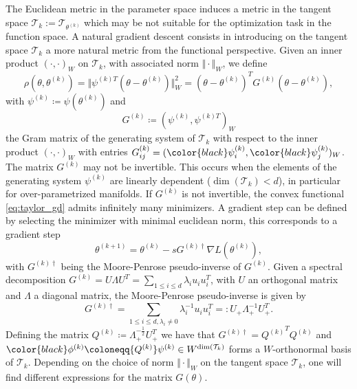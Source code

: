\documentclass{article}
\theoremstyle{noparens}
\newcommand{\cT}{\mathcal{T}}
\newcommand{\colorM}{\color{black}}
\newcommand{\paramk}{\theta^{(k)}}
\newcommand{\paramkp}{\theta^{(k+1)}}
\newcommand{\psik}{\psi^{(k)}}
\newcommand{\psikT}{\psi^{(k)T}}
\newcommand{\psiki}{{\colorM \psi^{(k)}_i}}
\newcommand{\psikj}{{\colorM \psi^{(k)}_j}}
\newcommand{\Qk}{{Q^{(k)}}}
\newcommand{\phik}{{\colorM \phi^{(k)}}}
\newcommand{\Gk}{{G^{(k)}}}
\newcommand{\Ginvk}{{G^{(k)\dagger}}}
\begin{document}
The Euclidean metric in the parameter space induces a metric in the tangent space $\cT_k := \cT_{\paramk}$ which may be not suitable for the optimization task in the function space. A natural gradient descent  consists in introducing on the tangent space $\cT_{k}$ a more natural metric from the functional perspective. Given an inner product $(\cdot, \cdot)_{W}$ on $\cT_{k}$, with associated norm $\Vert \cdot \Vert_{W}$, we define
$$
\rho(\theta , \paramk) =  \Vert \psikT (\theta - \paramk) \Vert_{W}^2 = (\theta - \paramk)^T \Gk (\theta - \paramk),
$$
with $\psik\coloneqq \psi(\paramk)$ and
\begin{equation}
\Gk \coloneqq (\psik ,\psikT)_W
\label{eq:gram}
\end{equation}
the Gram matrix of the generating system of $\cT_{k}$ with respect to the inner product $(\cdot,\cdot)_W$ with entries $G^{(k)}_{ij} = (\psiki ,\psikj )_W$.
The matrix $G^{(k)}$ may not be invertible. This occurs when the elements of the generating system $\psik$ are linearly dependent ($\dim(\cT_k) < d$), in particular for over-parametrized manifolds. If $G^{(k)}$ is not invertible, the convex functional \eqref{eq:taylor_gd} admits infinitely many minimizers. A gradient step can be defined by selecting the minimizer with minimal euclidean norm, this corresponds to a gradient step
\begin{equation}
\paramkp = \paramk - s \Ginvk \nabla L(\paramk), \label{eq:ngd-update}
\end{equation}
with $\Ginvk$ being the Moore-Penrose pseudo-inverse of $G^{(k)}$.
Given a spectral decomposition $\Gk = U \Lambda U^T = \sum_{1\le i \le d} \lambda_i u_iu_i^T$, with $U$ an orthogonal matrix and $\Lambda$ a diagonal matrix, the Moore-Penrose pseudo-inverse is given by
\begin{equation}
\Ginvk =  \sum_{1\le i \le d, \lambda_i \neq 0} \lambda_i^{-1} u_i u_i^T =: U_+\Lambda_+^{-1}U_+^T.
\label{eq:penrose}
\end{equation}
Defining the matrix
$\Qk \coloneqq \Lambda_+^{-\frac 1 2}U_+^T$
we have that $\Ginvk=\Qk^T\Qk$ and  $\phik\coloneqq \Qk \psik  \in W^{\dim(\cT_k)}$
forms a $W$-orthonormal basis of $\cT_k$.
Depending on the choice of norm $\Vert \cdot \Vert_W$ on  the tangent space $\cT_k$, one will find different expressions for the matrix $G(\theta)$.
\end{document}
